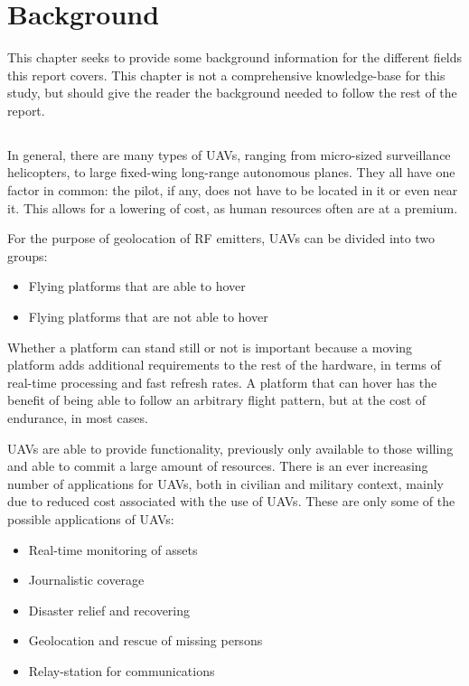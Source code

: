 \documentclass[10pt,a4paper]{book}
\begin{document}
\newpage

\chapter{Background}

This chapter seeks to provide some background information for the different fields this report covers. This chapter is not a comprehensive knowledge-base for this study, but should give the reader the background needed to follow the rest of the report. 
\newpage
\section{}

In general, there are many types of \glspl{UAV}, ranging from micro-sized surveillance helicopters, to large fixed-wing long-range autonomous planes. They all have one factor in common: the pilot, if any, does not have to be located in it or even near it. This allows for a lowering of cost, as human resources often are at a premium. 

For the purpose of geolocation of \gls{RF} emitters, \glspl{UAV} can be divided into two groups:

\begin{itemize}
\item Flying platforms that are able to hover
\item Flying platforms that are not able to hover
\end{itemize}

Whether a platform can stand still or not is important because a moving platform adds additional requirements to the rest of the hardware, in terms of real-time processing and fast refresh rates. A platform that can hover has the benefit of being able to follow an arbitrary flight pattern, but at the cost of endurance, in most cases.

\glspl{UAV} are able to provide functionality, previously only available to those willing and able to commit a large amount of resources. There is an ever increasing number of applications for \glspl{UAV}, both in civilian and military context, mainly due to reduced cost associated with the use of \glspl{UAV}. These are only some of the possible applications of \glspl{UAV}:

\begin{itemize}
\item Real-time monitoring of assets
\item Journalistic coverage
\item Disaster relief and recovering
\item Geolocation and rescue of missing persons
\item Relay-station for communications
\end{itemize}
\end{document}

